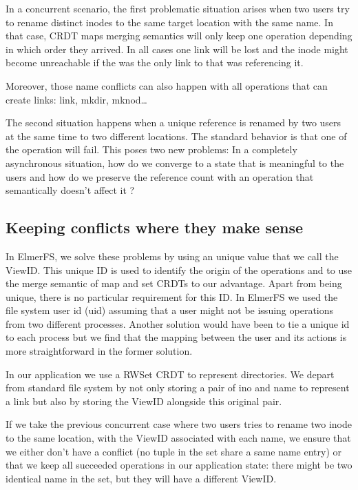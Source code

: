 \documentclass[sigplan, 10pt]{acmart}
\begin{document}
In a concurrent scenario, the first problematic situation
arises when two users try to rename distinct inodes to the same target location with the same name.
In that case, CRDT maps merging semantics will only keep one operation depending
in which order they arrived. In all cases one link will be lost and the inode
might become unreachable if the was the only link to that was referencing it.

Moreover, those name conflicts can also happen with all operations that
can create links: link, mkdir, mknod\dots

The second situation happens when a unique reference is renamed
by two users at the same time to two different locations. The standard behavior
is that one of the operation will fail. This poses two new problems: In a completely
asynchronous situation, how do we converge to a state that is meaningful to the
users and how do we preserve the reference count with an operation that
semantically doesn't affect it ?

\subsection{Keeping conflicts where they make sense}

In ElmerFS, we solve these problems by using an unique value that we call the
ViewID. This unique ID is used to identify the origin of the operations and to
use the merge semantic of map and set CRDTs to our advantage. Apart from
being unique, there is no particular requirement for this ID. In ElmerFS we used
the file system user id (uid) assuming that a user might not be
issuing operations from two different processes.
Another solution would have been to tie a unique id to each process
but we find that the mapping between the user and its actions is more
straightforward in the former solution.

In our application we use a RWSet CRDT to represent directories.
We depart from standard file system by not only storing a pair of ino
and name to represent a link but also by storing the ViewID alongside this
original pair.

If we take the previous concurrent case where two users tries to rename two
inode to the same location, with the ViewID associated with each name, we
ensure that we either don't have a conflict (no tuple in the set
share a same name entry) or that we keep all succeeded operations
in our application state: there might be two identical name in the set, but they
will have a different ViewID.
\end{document}
